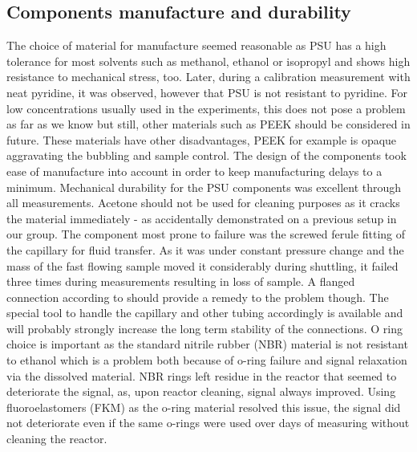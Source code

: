         \subsection{Components manufacture and durability}
        \label{sec:discussion:componentsAndDurability}
            The choice of material for manufacture seemed reasonable as PSU has a high tolerance for most solvents such as methanol, ethanol or isopropyl and shows high resistance to mechanical stress, too. Later, during a calibration measurement with neat pyridine, it was observed, however that PSU is not resistant to pyridine. For low concentrations usually used in the experiments, this does not pose a problem as far as we know but still, other materials such as PEEK should be considered in future. These materials have other disadvantages, PEEK for example is opaque aggravating the bubbling and sample control. The design of the components took ease of manufacture into account in order to keep manufacturing delays to a minimum.
            Mechanical durability for the PSU components was excellent through all measurements. Acetone should not be used for cleaning purposes as it cracks the material immediately - as accidentally demonstrated on a previous setup in our group. The component most prone to failure was the screwed ferule fitting of the capillary for fluid transfer. As it was under constant pressure change and the mass of the fast flowing sample moved it considerably during shuttling, it failed three times during measurements resulting in loss of sample. A flanged connection according to \cite{noauthor_finemech_nodate} should provide a remedy to the problem though. The special tool to handle the capillary and other tubing accordingly is available and will probably strongly increase the long term stability of the connections.
            O ring choice is important as the standard nitrile rubber (NBR) material is not resistant to ethanol which is a problem both because of o-ring failure and signal relaxation via the dissolved material. NBR rings left residue in the reactor that seemed to deteriorate the signal, as, upon reactor cleaning, signal always improved. Using fluoroelastomers (FKM) as the o-ring material resolved this issue, the signal did not deteriorate even if the same o-rings were used over days of measuring without cleaning the reactor.
